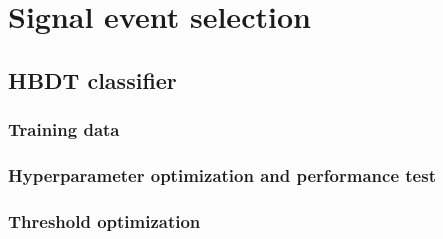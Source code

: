\chapter{Signal event selection}
\label{cap:event_selection}

\section{HBDT classifier}

\subsection{Training data}

\subsection{Hyperparameter optimization and performance test}

\subsection{Threshold optimization}